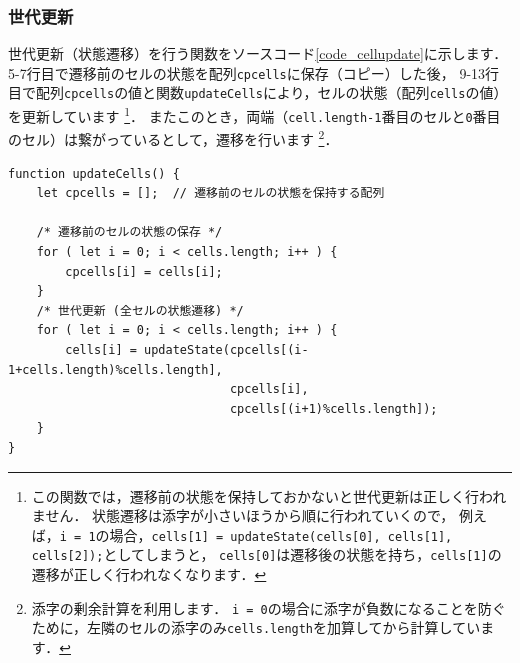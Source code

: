 \documentclass[dvipdfmx]{jsarticle}
\theoremstyle{definition}
\begin{document}
\subsubsection{世代更新}  \label{subsubsec_gen_update}
世代更新（状態遷移）を行う関数をソースコード\ref{code_cellupdate}に示します．
5-7行目で遷移前のセルの状態を配列\verb|cpcells|に保存（コピー）した後，
9-13行目で配列\verb|cpcells|の値と関数\verb|updateCells|により，セルの状態（配列\verb|cells|の値）を更新しています
\footnote{
    この関数では，遷移前の状態を保持しておかないと世代更新は正しく行われません．
    状態遷移は添字が小さいほうから順に行われていくので，
    例えば，\texttt{i = 1}の場合，\texttt{cells[1] = updateState(cells[0], cells[1], cells[2]);}としてしまうと，
    \texttt{cells[0]}は遷移後の状態を持ち，\texttt{cells[1]}の遷移が正しく行われなくなります．
}．
またこのとき，両端（\verb|cell.length-1|番目のセルと\verb|0|番目のセル）は繋がっているとして，遷移を行います
\footnote{
    添字の剰余計算を利用します．
    \texttt{i = 0}の場合に添字が負数になることを防ぐために，左隣のセルの添字のみ\texttt{cells.length}を加算してから計算しています．
}．
%
\begin{lstlisting}[caption=世代更新関数, label=code_cellupdate]
function updateCells() {
    let cpcells = [];  // 遷移前のセルの状態を保持する配列

    /* 遷移前のセルの状態の保存 */
    for ( let i = 0; i < cells.length; i++ ) {
        cpcells[i] = cells[i];
    }
    /* 世代更新 (全セルの状態遷移) */
    for ( let i = 0; i < cells.length; i++ ) {
        cells[i] = updateState(cpcells[(i-1+cells.length)%cells.length],
                               cpcells[i],
                               cpcells[(i+1)%cells.length]);
    }
}
\end{lstlisting}

\end{document}
